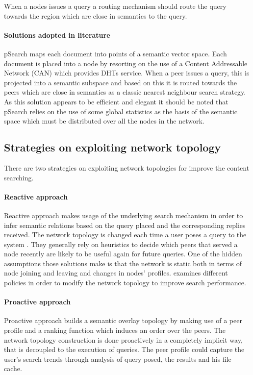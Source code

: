 When a nodes issues a query a routing mechanism should route the query towards the region which are close in semantics to the query.

\paragraph{Solutions adopted in literature} pSearch \cite{TXD03} maps each document into points of a semantic vector space. Each document is placed into a node by resorting on the use of a Content Addressable Network (CAN) which provides DHTs service. When a peer issues a query, this is projected into a semantic subspace and based on this it is routed towards the peers which are close in semantics as a classic nearest neighbour search strategy. As this solution appears to be efficient and elegant it should be noted that pSearch relies on the use of some global statistics as the basis of the semantic space which must be distributed over all the nodes in the network.

\subsection{Strategies on exploiting network topology}
There are two strategies on exploiting network topologies for improve the content searching.

\paragraph{Reactive approach} Reactive approach makes usage of the underlying search mechanism in order to infer semantic relations based on the query placed and the corresponding replies received. The network topology is changed each time a user poses a query to the system \cite{VKM+04, SMZ03}. They generally rely on heuristics to decide which peers that served a node recently are likely to be useful again for future queries. One of the hidden assumptions those solutions make is that the network is static both in terms of node joining and leaving and changes in nodes' profiles. \cite{VKM+04} examines different policies in order to modify the network topology to improve search performance.

\paragraph{Proactive approach} Proactive approach builds a semantic overlay topology by making use of a peer profile and a ranking function which induces an order over the peers. The network topology construction is done proactively in a completely implicit way, that is decoupled to the execution of queries. The peer profile could capture the user's search trends through analysis of query posed, the results and his file cache.

